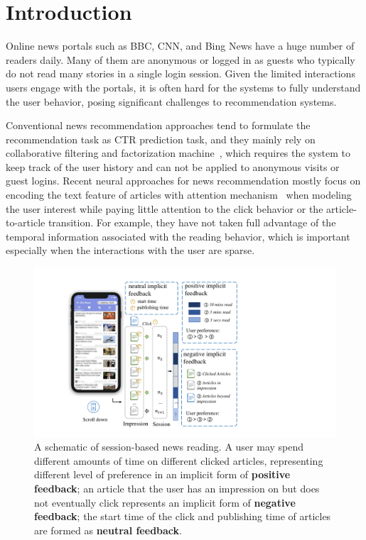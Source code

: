 \section{Introduction}
Online news portals such as BBC, CNN, and Bing News have a huge number 
of readers daily. Many of them are anonymous or logged in as guests who 
typically do not read many stories in a single login session.
Given the limited interactions users engage with the portals, it is often 
hard for the systems to fully understand the user behavior, posing significant challenges to recommendation systems. 

Conventional news recommendation approaches tend to formulate the 
recommendation task as CTR prediction task, and they mainly rely on 
collaborative filtering and factorization machine~\cite{cheng2016wide,guodeepfm2017,wang2018modeling,ge2020graph,hu2020graph,xie2020deep}, 
which requires the system to keep track of the user history 
and can not be applied to anonymous visits or guest logins. 
Recent neural approaches for news recommendation mostly focus on 
encoding the text feature of articles with 
attention mechanism~\cite{wang2018dkn,zhu2019dan,wu_neural_2019-1,wu2019npa,wang2020fine,wu2020CPRS} 
when modeling the user interest while paying little attention to the click 
behavior or the article-to-article transition. 
For example, they have not taken full advantage of the temporal information 
associated with the reading behavior, which is important
especially when the interactions with the user are sparse.

\begin{figure}[th]
    \centering
    \includegraphics[width=\columnwidth]{fig/stream.pdf}
    \caption{A schematic of session-based news reading. 
    A user may spend different amounts of time on different clicked articles, 
representing different level of preference in an implicit form of 
\textbf{positive feedback}; 
an article that the user has an impression on but does not eventually click 
represents an implicit form of \textbf{negative feedback}; the start time of the click and publishing time of articles are formed as \textbf{neutral feedback}.}
\label{fig:session}
\end{figure}

